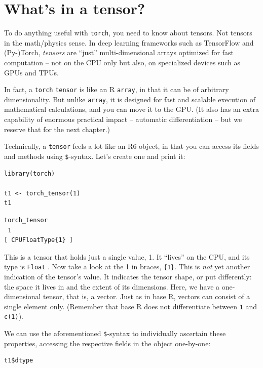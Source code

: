\documentclass[
  letterpaper,
]{krantz}
\begin{document}
\hypertarget{whats-in-a-tensor}{%
\section{What's in a tensor?}\label{whats-in-a-tensor}}

To do anything useful with \texttt{torch}, you need to know about
tensors. Not tensors in the math/physics sense. In deep learning
frameworks such as TensorFlow and (Py-)Torch, \emph{tensors} are
``just'' multi-dimensional arrays optimized for fast computation -- not
on the CPU only but also, on specialized devices such as GPUs and TPUs.

In fact, a \texttt{torch} \texttt{tensor} is like an R \texttt{array},
in that it can be of arbitrary dimensionality. But unlike
\texttt{array}, it is designed for fast and scalable execution of
mathematical calculations, and you can move it to the GPU. (It also has
an extra capability of enormous practical impact -- automatic
differentiation -- but we reserve that for the next chapter.)

Technically, a \texttt{tensor} feels a lot like an R6 object, in that
you can access its fields and methods using \texttt{\$}-syntax. Let's
create one and print it:

\begin{verbatim}
library(torch)

t1 <- torch_tensor(1)
t1
\end{verbatim}

\begin{verbatim}
torch_tensor
 1
[ CPUFloatType{1} ]
\end{verbatim}

This is a tensor that holds just a single value, 1. It ``lives'' on the
CPU, and its type is \texttt{Float} . Now take a look at the 1 in
braces, \texttt{\{1\}}. This is \emph{not} yet another indication of the
tensor's value. It indicates the tensor shape, or put differently: the
space it lives in and the extent of its dimensions. Here, we have a
one-dimensional tensor, that is, a vector. Just as in base R, vectors
can consist of a single element only. (Remember that base R does not
differentiate between \texttt{1} and \texttt{c(1)}).

We can use the aforementioned \texttt{\$}-syntax to individually
ascertain these properties, accessing the respective fields in the
object one-by-one:

\begin{verbatim}
t1$dtype
\end{verbatim}
\end{document}
